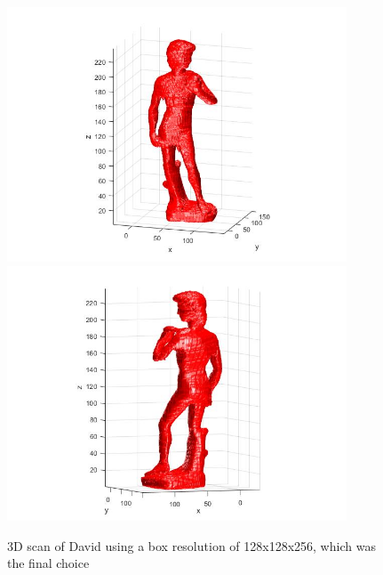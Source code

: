 \documentclass[12pt]{article}
\begin{document}
\vspace{5mm}
\begin{figure}[H]
	\centering
	\includegraphics[width=0.9\textwidth]{david_256_1.jpg}
	\includegraphics[width=0.9\textwidth]{david_256_2.jpg}
	\caption{3D scan of David using a box resolution of 128x128x256, which was the final choice}
	\label{fig1}
\end{figure}
\vspace{5mm}
\end{document}
